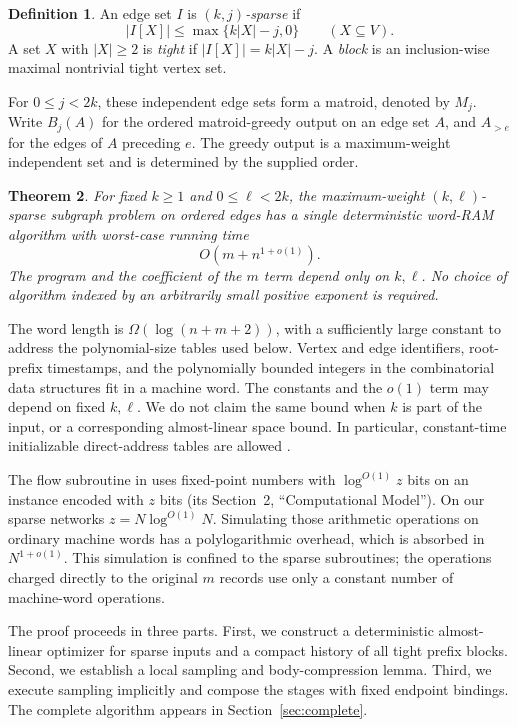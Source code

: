 \documentclass[11pt,a4paper]{article}
\newtheorem{theorem}{Theorem}[section]
\theoremstyle{definition}
\newtheorem{definition}[theorem]{Definition}
\theoremstyle{remark}
\newcommand{\Bj}[2]{B_{#1}(#2)}
\begin{document}
\begin{definition}
An edge set $I$ is \emph{$(k,j)$-sparse} if
\[
 |I[X]|\leq\max\{k|X|-j,0\}
 \qquad(X\subseteq V).
\]
A set $X$ with $|X|\geq2$ is \emph{tight} if
$|I[X]|=k|X|-j$. A \emph{block} is an inclusion-wise maximal
nontrivial tight vertex set.
\end{definition}

For $0\leq j<2k$, these independent edge sets form a matroid,
denoted by $M_j$. Write $\Bj jA$ for the ordered matroid-greedy
output on an edge set $A$, and $A_{>e}$ for the edges of $A$
preceding $e$. The greedy output is a maximum-weight independent
set and is determined by the supplied order.

\begin{theorem}\label{thm:main}
For fixed $k\geq1$ and $0\leq\ell<2k$, the maximum-weight
$(k,\ell)$-sparse subgraph problem on ordered edges has a single
deterministic word-RAM algorithm with worst-case running time
\[
 \boxed{O(m+n^{1+o(1)})}.
\]
The program and the coefficient of the $m$ term depend only on
$k,\ell$. No choice of algorithm indexed by an arbitrarily small
positive exponent is required.
\end{theorem}

The word length is $\Omega(\log(n+m+2))$, with a sufficiently large
constant to address the polynomial-size tables used below.
Vertex and edge identifiers, root-prefix timestamps, and the
polynomially bounded integers in the combinatorial data structures
fit in a machine word. The constants and the $o(1)$ term may
depend on fixed $k,\ell$. We do not claim the same bound when
$k$ is part of the input, or a corresponding almost-linear space
bound. In particular, constant-time initializable direct-address
tables are allowed \cite{initializable}.

The flow subroutine in \cite{mcf} uses fixed-point numbers with
$\log^{O(1)}z$ bits on an instance encoded with $z$ bits
(its Section~2, ``Computational Model''). On our sparse networks
$z=N\log^{O(1)}N$. Simulating those arithmetic operations on
ordinary machine words has a polylogarithmic overhead, which is
absorbed in $N^{1+o(1)}$. This simulation is confined to the sparse
subroutines; the operations charged directly to the original $m$
records use only a constant number of machine-word operations.

The proof proceeds in three parts. First, we construct a
deterministic almost-linear optimizer for sparse inputs and a
compact history of all tight prefix blocks. Second, we establish
a local sampling and body-compression lemma. Third, we execute
sampling implicitly and compose the stages with fixed endpoint
bindings. The complete algorithm appears in
Section~\ref{sec:complete}.
\end{document}
